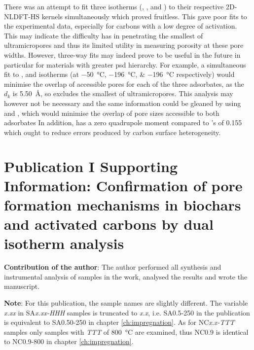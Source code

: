 There was an attempt to fit three isotherms (, , and ) to their respective 2D-NLDFT-HS kernels simultaneously which proved fruitless. This gave poor fits to the experimental data, especially for carbons with a low degree of activation. This may indicate the difficulty  has in penetrating the smallest of \glspl{ultramicropore} and thus its limited utility in measuring porosity at these pore widths. However, three-way fits may indeed prove to be useful in the future in particular for materials with greater \acrshort{psd} hierarchy. For example, a simultaneous fit to ,  and  isotherms (at \qtylist[list-units=single]{-50;-196;-196}{\degreeCelsius} respectively) would minimise the overlap of accessible pores for each of the three \glspl{adsorbate}, as the $d_k$ is \qty{5.50}{\angstrom}, so excludes the smallest of \glspl{ultramicropore}. This analysis may however not be necessary and the same information could be gleaned by using  and , which would minimise the overlap of pore sizes accessible to both \glspl{adsorbate} In addition,  has a zero quadrupole moment compared to 's of 0.155 which ought to reduce errors produced by carbon surface heterogeneity.


\newpage
\section[Publication I Supporting Information]{Publication I Supporting Information: Confirmation of pore formation mechanisms in biochars and activated carbons by dual isotherm analysis}

\textbf{Contribution of the author}: The author performed all synthesis and instrumental analysis of samples in the work, analysed the results and wrote the manuscript.

\textbf{Note}: For this publication, the sample names are slightly different. The variable \textit{x.xx} in SA\textit{x.xx-HHH} samples is truncated to \textit{x.x}, i.e. SA0.5-250 in the publication is equivalent to SA0.50-250 in chapter \ref{ch:impregnation}. As for NC\textit{x.x-TTT} samples only samples with \textit{TTT} of \qty{800}{\degreeCelsius} are examined, thus NC0.9 is identical to NC0.9-800 in chapter \ref{ch:impregnation}.
\setcounter{opagenum}{\thepage}
\newpage

\setlength{\originalVOffset}{\voffset}   
\setlength{\originalHOffset}{\hoffset}

\setlength{\voffset}{0cm}
\setlength{\hoffset}{0cm}

\setlength{\voffset}{\originalVOffset}
\setlength{\hoffset}{\originalHOffset}


